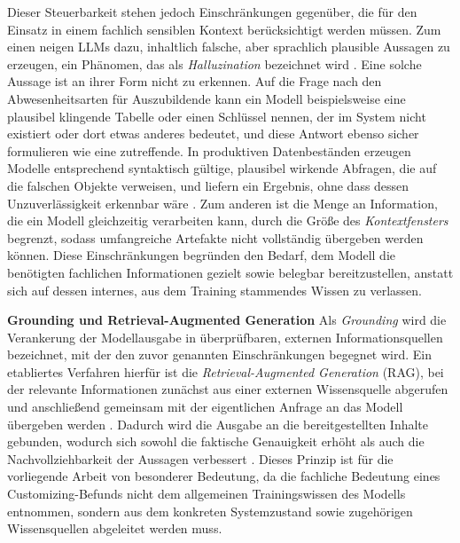 Dieser Steuerbarkeit stehen jedoch Einschränkungen gegenüber, die für den Einsatz in einem fachlich sensiblen Kontext berücksichtigt werden müssen. Zum einen neigen LLMs dazu, inhaltlich falsche, aber sprachlich plausible Aussagen zu erzeugen, ein Phänomen, das als \emph{Halluzination} bezeichnet wird \cite{gao_retrieval-augmented_2024}. Eine solche Aussage ist an ihrer Form nicht zu erkennen. Auf die Frage nach den Abwesenheitsarten für Auszubildende kann ein Modell beispielsweise eine plausibel klingende Tabelle oder einen Schlüssel nennen, der im System nicht existiert oder dort etwas anderes bedeutet, und diese Antwort ebenso sicher formulieren wie eine zutreffende. In produktiven Datenbeständen erzeugen Modelle entsprechend syntaktisch gültige, plausibel wirkende Abfragen, die auf die falschen Objekte verweisen, und liefern ein Ergebnis, ohne dass dessen Unzuverlässigkeit erkennbar wäre \cite{helwig_metadata_2026}. Zum anderen ist die Menge an Information, die ein Modell gleichzeitig verarbeiten kann, durch die Größe des \emph{Kontextfensters} begrenzt, sodass umfangreiche Artefakte nicht vollständig übergeben werden können. Diese Einschränkungen begründen den Bedarf, dem Modell die benötigten fachlichen Informationen gezielt sowie belegbar bereitzustellen, anstatt sich auf dessen internes, aus dem Training stammendes Wissen zu verlassen.

\textbf{Grounding und Retrieval-Augmented Generation}
Als \emph{Grounding} wird die Verankerung der Modellausgabe in überprüfbaren, externen Informationsquellen bezeichnet, mit der den zuvor genannten Einschränkungen begegnet wird. Ein etabliertes Verfahren hierfür ist die \emph{Retrieval-Augmented Generation} (RAG), bei der relevante Informationen zunächst aus einer externen Wissensquelle abgerufen und anschließend gemeinsam mit der eigentlichen Anfrage an das Modell übergeben werden \cite{lewis_retrieval-augmented_2021}. Dadurch wird die Ausgabe an die bereitgestellten Inhalte gebunden, wodurch sich sowohl die faktische Genauigkeit erhöht als auch die Nachvollziehbarkeit der Aussagen verbessert \cite{gao_retrieval-augmented_2024}. Dieses Prinzip ist für die vorliegende Arbeit von besonderer Bedeutung, da die fachliche Bedeutung eines Customizing-Befunds nicht dem allgemeinen Trainingswissen des Modells entnommen, sondern aus dem konkreten Systemzustand sowie zugehörigen Wissensquellen abgeleitet werden muss.

